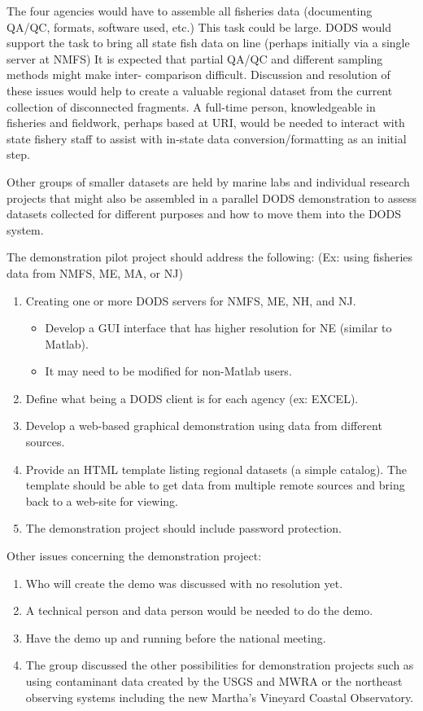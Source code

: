 The four agencies would have to assemble all fisheries data
(documenting QA/QC, formats, software used, etc.)  This task could be
large. DODS would support the task to bring all state fish data on
line (perhaps initially via a single server at NMFS) It is expected
that partial QA/QC and different sampling methods might make inter-
comparison difficult.  Discussion and resolution of these issues would
help to create a valuable regional dataset from the current collection
of disconnected fragments.  A full-time person, knowledgeable in
fisheries and fieldwork, perhaps based at URI, would be needed to
interact with state fishery staff to assist with in-state data
conversion/formatting as an initial step.

Other groups of smaller datasets are held by marine labs and
individual research projects that might also be assembled in a
parallel DODS demonstration to assess datasets collected for different
purposes and how to move them into the DODS system.

The demonstration pilot project should address the following:
(Ex: using fisheries data from NMFS, ME, MA, or NJ)
\begin{enumerate}
\item Creating one or more DODS servers for NMFS, ME, NH, and NJ.
  \begin{itemize}
  \item Develop a GUI interface that has higher resolution for NE
    (similar to Matlab).
  \item It may need to be modified for non-Matlab users.
  \end{itemize}
\item Define what being a DODS client is for each agency (ex: EXCEL).
\item Develop a web-based graphical demonstration using data from
  different sources.
\item Provide an HTML template listing regional datasets (a simple
  catalog).  The template should be able to get data from multiple
  remote sources and bring back to a web-site for viewing.
\item The demonstration project should include password protection.
\end{enumerate}

Other issues concerning the demonstration project:
\begin{enumerate}
\item Who will create the demo was discussed with no resolution yet.
\item A technical person and data person would be needed to do the demo.
\item Have the demo up and running before the national meeting.
\item The group discussed the other possibilities for demonstration
  projects such as using contaminant data created by the USGS and MWRA
  or the northeast observing systems including the new Martha's
  Vineyard Coastal Observatory.
\end{enumerate}

